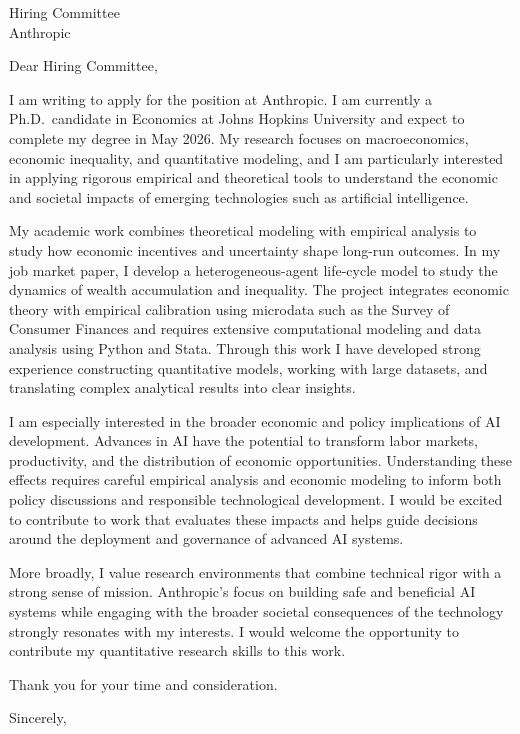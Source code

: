 \documentclass[11pt]{letter}
\begin{document}
\begin{letter}{Hiring Committee \\
Anthropic}

\opening{Dear Hiring Committee,}

I am writing to apply for the position at Anthropic. I am currently a Ph.D.\ candidate in Economics at Johns Hopkins University and expect to complete my degree in May 2026. My research focuses on macroeconomics, economic inequality, and quantitative modeling, and I am particularly interested in applying rigorous empirical and theoretical tools to understand the economic and societal impacts of emerging technologies such as artificial intelligence.

My academic work combines theoretical modeling with empirical analysis to study how economic incentives and uncertainty shape long-run outcomes. In my job market paper, I develop a heterogeneous-agent life-cycle model to study the dynamics of wealth accumulation and inequality. The project integrates economic theory with empirical calibration using microdata such as the Survey of Consumer Finances and requires extensive computational modeling and data analysis using Python and Stata. Through this work I have developed strong experience constructing quantitative models, working with large datasets, and translating complex analytical results into clear insights.

I am especially interested in the broader economic and policy implications of AI development. Advances in AI have the potential to transform labor markets, productivity, and the distribution of economic opportunities. Understanding these effects requires careful empirical analysis and economic modeling to inform both policy discussions and responsible technological development. I would be excited to contribute to work that evaluates these impacts and helps guide decisions around the deployment and governance of advanced AI systems.

More broadly, I value research environments that combine technical rigor with a strong sense of mission. Anthropic’s focus on building safe and beneficial AI systems while engaging with the broader societal consequences of the technology strongly resonates with my interests. I would welcome the opportunity to contribute my quantitative research skills to this work.

Thank you for your time and consideration.

\closing{Sincerely,}

\end{letter}
\end{document}
